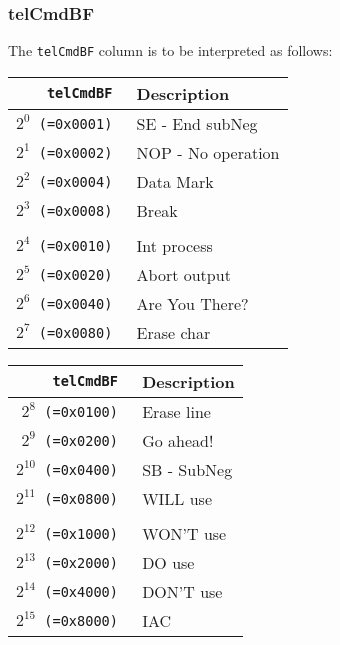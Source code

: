 \documentclass[documentation]{subfiles}
\begin{document}
\subsubsection{telCmdBF}\label{telCmdBF}
The {\tt telCmdBF} column is to be interpreted as follows:\\
\begin{minipage}{.48\textwidth}
    \begin{longtable}{>{\tt}rl}
        \toprule
        {\bf telCmdBF} & {\bf Description} \\
        \midrule\endhead%
        $2^{0}$  (=0x0001) & SE - End subNeg\\
        $2^{1}$  (=0x0002) & NOP - No operation\\
        $2^{2}$  (=0x0004) & Data Mark\\
        $2^{3}$  (=0x0008) & Break\\
        \\
        $2^{4}$  (=0x0010) & Int process\\
        $2^{5}$  (=0x0020) & Abort output\\
        $2^{6}$  (=0x0040) & Are You There?\\
        $2^{7}$  (=0x0080) & Erase char\\
        \bottomrule
    \end{longtable}
\end{minipage}
\hfill
\begin{minipage}{.48\textwidth}
    \begin{longtable}{>{\tt}rl}
        \toprule
        {\bf telCmdBF} & {\bf Description} \\
        \midrule\endhead%
        $2^{8}$  (=0x0100) & Erase line\\
        $2^{9}$  (=0x0200) & Go ahead!\\
        $2^{10}$ (=0x0400) & SB - SubNeg\\
        $2^{11}$ (=0x0800) & WILL use\\
        \\
        $2^{12}$ (=0x1000) & WON'T use\\
        $2^{13}$ (=0x2000) & DO use\\
        $2^{14}$ (=0x4000) & DON'T use\\
        $2^{15}$ (=0x8000) & IAC\\
        \bottomrule
    \end{longtable}
\end{minipage}
\end{document}
